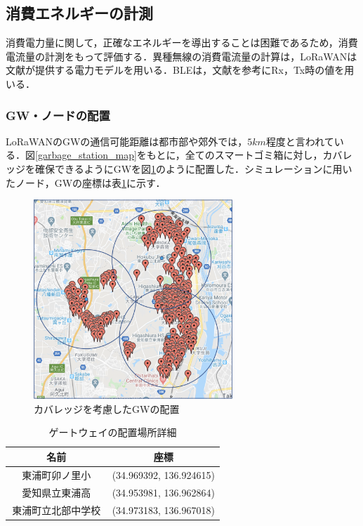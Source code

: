 \documentclass[Japanese]{dicomopapers}
\begin{document}
\subsection{消費エネルギーの計測}
消費電力量に関して，正確なエネルギーを導出することは困難であるため，消費電流量の計測をもって評価する．異種無線の消費電流量の計算は，LoRaWANは文献\cite{lorawan_github}が提供する電力モデルを用いる．BLEは，文献\cite{ble_energy_consumption}を参考にRx，Tx時の値を用いる．

\subsubsection{GW・ノードの配置}
LoRaWANのGWの通信可能距離は都市部や郊外では，$5km$程度と言われている．図\ref{garbage_station_map}をもとに，全てのスマートゴミ箱に対し，カバレッジを確保できるようにGWを図\ref{lorawan_area}のように配置した．シミュレーションに用いたノード，GWの座標は表\ref{tab:gateway_position_detail}に示す．


\begin{figure}[h]
    \centering
    \includegraphics[width=7.5cm]{img/lorawan_area.png}
    \caption{カバレッジを考慮したGWの配置}
    \label{lorawan_area}
\end{figure}

\begin{table}[h]
    \centering
    \caption{ゲートウェイの配置場所詳細}
    \label{tab:gateway_position_detail}
    \begin{tabular}{|c|c|}
    \hline
    \textbf{名前} & \textbf{座標} \\ \hline
    東浦町卯ノ里小 　　& (34.969392, 136.924615) \\ \hline
    愛知県立東浦高 　　& (34.953981, 136.962864) \\ \hline
    東浦町立北部中学校 & (34.973183, 136.967018) \\ \hline
    \end{tabular}
\end{table}
\end{document}
